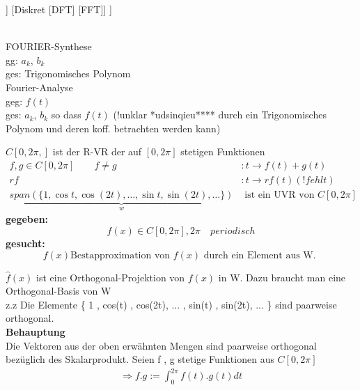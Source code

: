 	\begin{forest}
	[FOURIER-Theorie 
	[	kontinuierlich[Fourier-Reihen]  ]
	[Diskret [DFT] [FFT]]
	]
\end{forest}\\

\newpage
FOURIER-Synthese\\
gg: $a_k$, $b_k$\\
ges: Trigonomisches Polynom\\
Fourier-Analyse\\
geg: $f(t)$\\
ges: $a_k$, $b_k$ so dass $f(t)$ (!unklar *udsinqieu**** durch ein Trigonomisches Polynom und deren koff. betrachten werden kann)\\
\begin{remark}
$	C[0,2\pi,]$ ist der R-VR der auf $[0,2\pi]$ stetigen Funktionen \\

 \begin{align*}
f,g \in C[0,2\pi] \qquad f \neq g &: t \rightarrow f(t) + g(t)\\
r f &:t \rightarrow rf(t)  (!fehlt)\\
\underbrace{span( \{ 1,\cos t , \cos(2t),\dots,\sin t,\sin (2t),\dots   \}) }_{w}&\text{ ist ein UVR von }  C[0,2\pi]
\end{align*}
\textbf{gegeben:} 
\[ f(x) \in  C[0,2\pi] , 2\pi \quad periodisch   \]
\textbf{gesucht:} \[ f(x) \text{Bestapproximation von } f(x)  \text{ durch ein Element aus W. } \]  
\end{remark}
$\hat{f}(x)$ ist eine Orthogonal-Projektion von $f(x)$ in W. Dazu braucht man eine Orthogonal-Basis von W \\
z.z Die Elemente \{ 1 , cos(t) , cos(2t), ... , sin(t) , sin(2t), ... \} sind paarweise orthogonal.\\
\textbf{Behauptung}\\
Die Vektoren aus der oben erwähnten Mengen sind paarweise orthogonal bezüglich des Skalarprodukt.
Seien f , g stetige Funktionen aus $C[0,2 \pi]$  
\begin{align*}
\Rightarrow f . g := \int_{0}^{2 \pi} {f(t) . g(t) dt } 
\end{align*}


